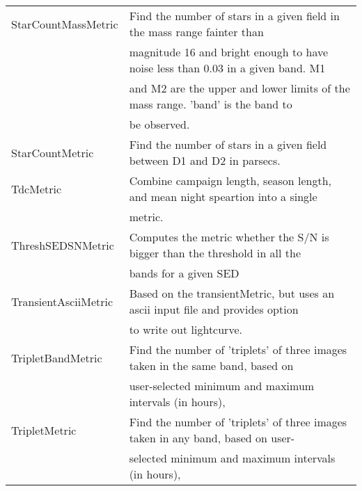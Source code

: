 \begin{table}
\begin{tabular}{ll}
 StarCountMassMetric &  Find the number of stars in a given field in the mass range fainter than \\
  &  magnitude 16 and bright enough to have noise less than 0.03 in a given band. M1 \\
  &  and M2 are the upper and lower limits of the mass range. 'band' is the band to \\
  &  be observed. \\
 StarCountMetric &  Find the number of stars in a given field between D1 and D2 in parsecs. \\
 TdcMetric &  Combine campaign length, season length, and mean night speartion into a single \\
  &  metric. \\
 ThreshSEDSNMetric &  Computes the metric whether the S/N is bigger than the threshold in all the \\
  &  bands for a given SED \\
 TransientAsciiMetric &  Based on the transientMetric, but uses an ascii input file and provides option \\
  &  to write out lightcurve. \\
 TripletBandMetric &  Find the number of 'triplets' of three images taken in the same band, based on \\
  &  user-selected minimum and maximum intervals (in hours), \\
 TripletMetric &  Find the number of 'triplets' of three images taken in any band, based on user- \\
  &  selected minimum and maximum intervals (in hours), \\
\hline
\end{tabular}

\end{table}